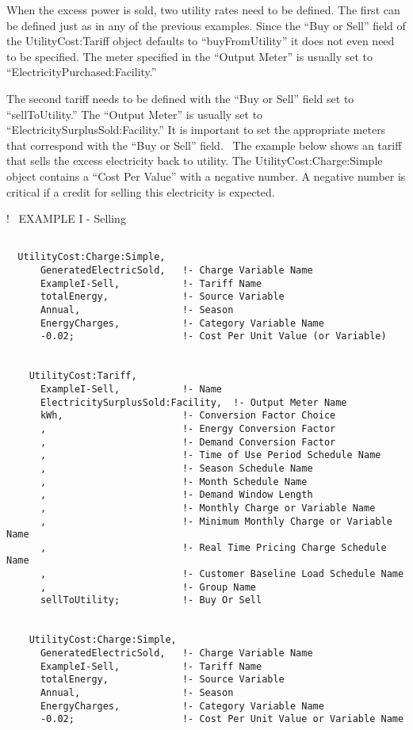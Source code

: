 When the excess power is sold, two utility rates need to be defined. The first can be defined just as in any of the previous examples. Since the ``Buy or Sell'' field of the UtilityCost:Tariff object defaults to ``buyFromUtility'' it does not even need to be specified. The meter specified in the ``Output Meter'' is usually set to ``ElectricityPurchased:Facility.''

The second tariff needs to be defined with the ``Buy or Sell'' field set to ``sellToUtility.'' The ``Output Meter'' is usually set to ``ElectricitySurplusSold:Facility.'' It is important to set the appropriate meters that correspond with the ``Buy or Sell'' field.~ The example below shows an tariff that sells the excess electricity back to utility. The UtilityCost:Charge:Simple object contains a ``Cost Per Value'' with a negative number. A negative number is critical if a credit for selling this electricity is expected.

!~ EXAMPLE I - Selling

\begin{lstlisting}

  UtilityCost:Charge:Simple,
      GeneratedElectricSold,   !- Charge Variable Name
      ExampleI-Sell,           !- Tariff Name
      totalEnergy,             !- Source Variable
      Annual,                  !- Season
      EnergyCharges,           !- Category Variable Name
      -0.02;                   !- Cost Per Unit Value (or Variable)


    UtilityCost:Tariff,
      ExampleI-Sell,           !- Name
      ElectricitySurplusSold:Facility,  !- Output Meter Name
      kWh,                     !- Conversion Factor Choice
      ,                        !- Energy Conversion Factor
      ,                        !- Demand Conversion Factor
      ,                        !- Time of Use Period Schedule Name
      ,                        !- Season Schedule Name
      ,                        !- Month Schedule Name
      ,                        !- Demand Window Length
      ,                        !- Monthly Charge or Variable Name
      ,                        !- Minimum Monthly Charge or Variable Name
      ,                        !- Real Time Pricing Charge Schedule Name
      ,                        !- Customer Baseline Load Schedule Name
      ,                        !- Group Name
      sellToUtility;           !- Buy Or Sell


    UtilityCost:Charge:Simple,
      GeneratedElectricSold,   !- Charge Variable Name
      ExampleI-Sell,           !- Tariff Name
      totalEnergy,             !- Source Variable
      Annual,                  !- Season
      EnergyCharges,           !- Category Variable Name
      -0.02;                   !- Cost Per Unit Value or Variable Name
\end{lstlisting}

